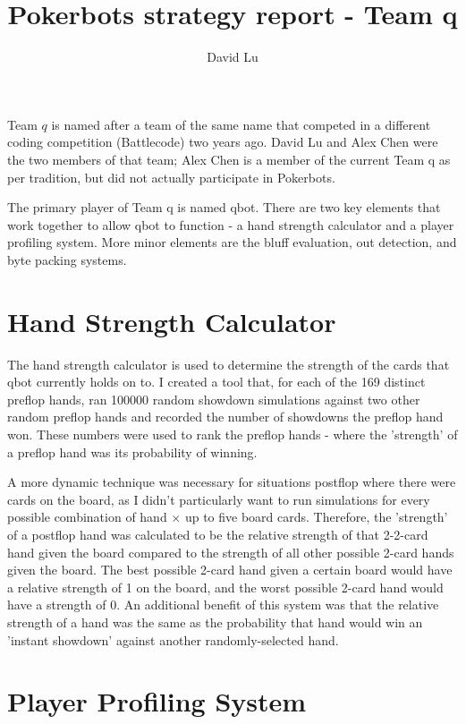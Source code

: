 \documentclass[]{article}
\title{Pokerbots strategy report - Team q}
\author{David Lu}
\begin{document}
\maketitle

\hspace{.1in}

Team $q$ is named after a team of the same name that competed in a different coding competition (Battlecode) two years ago. David Lu and Alex Chen were the two members of that team; Alex Chen is a member of the current Team q as per tradition, but did not actually participate in Pokerbots.

The primary player of Team q is named qbot. There are two key elements that work together to allow qbot to function - a hand strength calculator and a player profiling system. More minor elements are the bluff evaluation, out detection, and byte packing systems.

\section{Hand Strength Calculator}

The hand strength calculator is used to determine the strength of the cards that qbot currently holds on to. I created a tool that, for each of the 169 distinct preflop hands, ran 100000 random showdown simulations against two other random preflop hands and recorded the number of showdowns the preflop hand won. These numbers were used to rank the preflop hands - where the 'strength' of a preflop hand was its probability of winning.

A more dynamic technique was necessary for situations postflop where there were cards on the board, as I didn't particularly want to run simulations for every possible combination of hand $\times $ up to five board cards. Therefore, the 'strength' of a postflop hand was calculated to be the relative strength of that 2-2-card hand given the board compared to the strength of all other possible 2-card hands given the board. The best possible 2-card hand given a certain board would have a relative strength of 1 on the board, and the worst possible 2-card hand would have a strength of 0. An additional benefit of this system was that the relative strength of a hand was the same as the probability that hand would win an 'instant showdown' against another randomly-selected hand.

\section{Player Profiling System}
\end{document}

